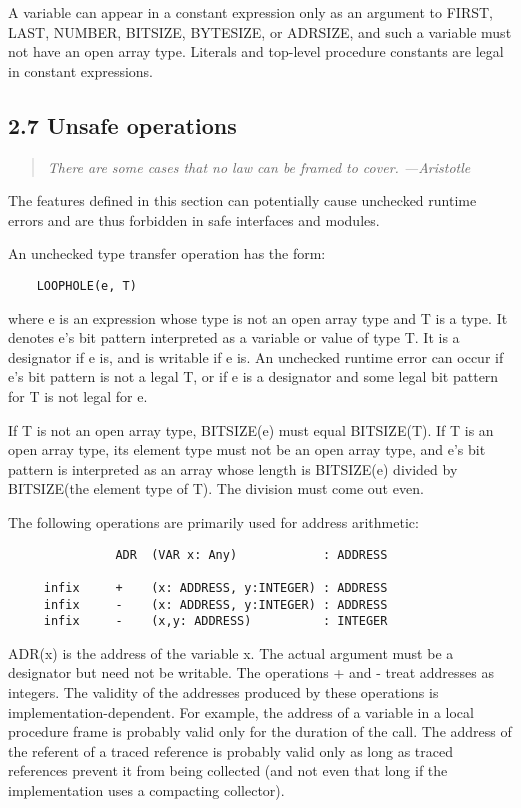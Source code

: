 \documentclass[10pt]{article}
\begin{document}
A variable can appear in a constant expression only as an argument to FIRST,
LAST, NUMBER, BITSIZE, BYTESIZE, or ADRSIZE, and such a variable must not have
an open array type. Literals and top-level procedure constants are legal in
constant expressions.

\subsection*{2.7 Unsafe operations}

\begin{quote}
  \emph{ There are some cases that no law can be framed to cover. ---Aristotle
  }
\end{quote}

The features defined in this section can potentially cause unchecked runtime
errors and are thus forbidden in safe interfaces and modules.

An unchecked type transfer operation has the form:
\begin{verbatim}
    LOOPHOLE(e, T)
\end{verbatim}
where e is an expression whose type is not an open array type and T is a
type. It denotes e's bit pattern interpreted as a variable or value of type
T. It is a designator if e is, and is writable if e is. An unchecked runtime
error can occur if e's bit pattern is not a legal T, or if e is a designator
and some legal bit pattern for T is not legal for e.

If T is not an open array type, BITSIZE(e) must equal BITSIZE(T). If T is an
open array type, its element type must not be an open array type, and e's bit
pattern is interpreted as an array whose length is BITSIZE(e) divided by
BITSIZE(the element type of T). The division must come out even.

The following operations are primarily used for address arithmetic:
\begin{verbatim}
               ADR  (VAR x: Any)            : ADDRESS

     infix     +    (x: ADDRESS, y:INTEGER) : ADDRESS
     infix     -    (x: ADDRESS, y:INTEGER) : ADDRESS
     infix     -    (x,y: ADDRESS)          : INTEGER
\end{verbatim}
ADR(x) is the address of the variable x. The actual argument must be a
designator but need not be writable. The operations + and - treat addresses as
integers. The validity of the addresses produced by these operations is
implementation-dependent. For example, the address of a variable in a local
procedure frame is probably valid only for the duration of the call. The
address of the referent of a traced reference is probably valid only as long
as traced references prevent it from being collected (and not even that long
if the implementation uses a compacting collector).
\end{document}
